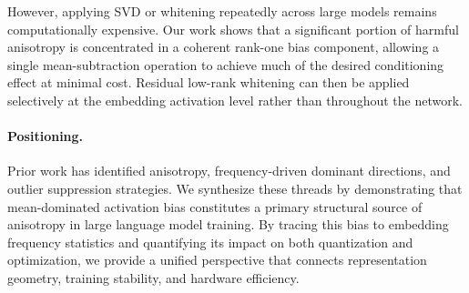 However, applying SVD or whitening repeatedly across large models
remains computationally expensive.
Our work shows that a significant portion of harmful anisotropy
is concentrated in a coherent rank-one bias component,
allowing a single mean-subtraction operation to achieve much of the
desired conditioning effect at minimal cost.
Residual low-rank whitening can then be applied selectively at the
embedding activation level rather than throughout the network.

\paragraph{Positioning.}
Prior work has identified anisotropy, frequency-driven dominant directions,
and outlier suppression strategies.
We synthesize these threads by demonstrating that
mean-dominated activation bias constitutes a primary structural source
of anisotropy in large language model training.
By tracing this bias to embedding frequency statistics and quantifying its
impact on both quantization and optimization,
we provide a unified perspective that connects representation geometry,
training stability, and hardware efficiency.